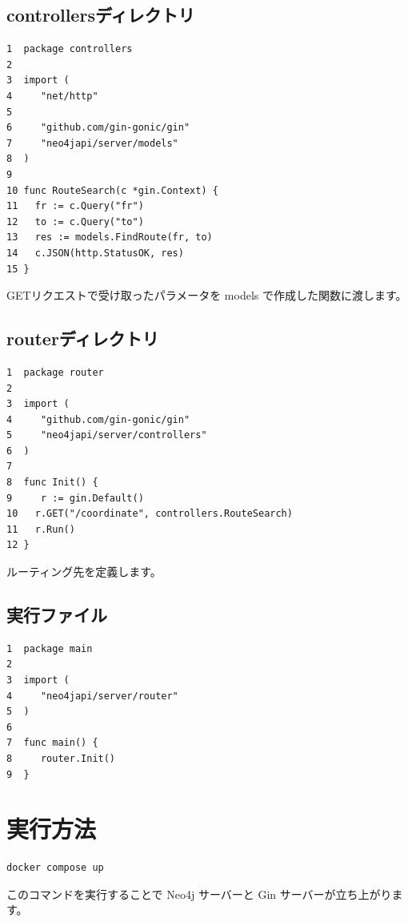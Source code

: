 \subsection{controllersディレクトリ}

\begin{tcolorbox}[title=coordinate\_controller.go]
\begin{verbatim}
1  package controllers
2
3  import (
4	  "net/http"
5
6	  "github.com/gin-gonic/gin"
7	  "neo4japi/server/models"
8  )
9
10 func RouteSearch(c *gin.Context) {
11	 fr := c.Query("fr")
12	 to := c.Query("to")
13	 res := models.FindRoute(fr, to)
14	 c.JSON(http.StatusOK, res)
15 }
\end{verbatim}
\end{tcolorbox}
GETリクエストで受け取ったパラメータを models で作成した関数に渡します。
\subsection{routerディレクトリ}

\begin{tcolorbox}[title=router.go]
\begin{verbatim}
1  package router
2
3  import (
4	  "github.com/gin-gonic/gin"
5	  "neo4japi/server/controllers"
6  )
7
8  func Init() {
9	  r := gin.Default()
10	 r.GET("/coordinate", controllers.RouteSearch)
11	 r.Run()
12 }
\end{verbatim}
\end{tcolorbox}
ルーティング先を定義します。
\subsection{実行ファイル}
\begin{tcolorbox}[title=coordinate\_controller.go]
\begin{verbatim}
1  package main
2
3  import (
4	  "neo4japi/server/router"
5  )
6
7  func main() {
8	  router.Init()
9  }
\end{verbatim}
\end{tcolorbox}

\section{実行方法}
\begin{tcolorbox}[breakable]
\begin{verbatim}
docker compose up
\end{verbatim}
\end{tcolorbox}
このコマンドを実行することで Neo4j サーバーと Gin サーバーが立ち上がります。
